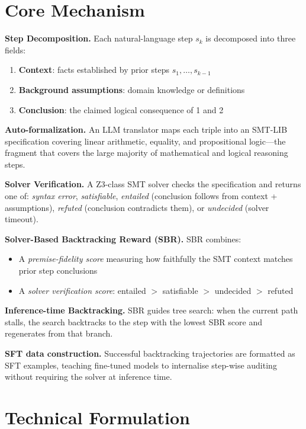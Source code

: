 \documentclass[10pt,twocolumn]{article}
\begin{document}
\section{Core Mechanism}

\textbf{Step Decomposition.} Each natural-language step $s_k$ is
decomposed into three fields:
\begin{enumerate}[itemsep=2pt,parsep=0pt]
  \item \textbf{Context}: facts established by prior steps $s_1,\ldots,s_{k-1}$
  \item \textbf{Background assumptions}: domain knowledge or definitions
  \item \textbf{Conclusion}: the claimed logical consequence of 1 and 2
\end{enumerate}

\textbf{Auto-formalization.} An LLM translator maps each triple into
an SMT-LIB specification covering linear arithmetic, equality, and
propositional logic---the fragment that covers the large majority of
mathematical and logical reasoning steps.

\textbf{Solver Verification.} A Z3-class SMT solver checks the
specification and returns one of:
\textit{syntax error}, \textit{satisfiable}, \textit{entailed}
(conclusion follows from context + assumptions),
\textit{refuted} (conclusion contradicts them), or
\textit{undecided} (solver timeout).

\textbf{Solver-Based Backtracking Reward (SBR).} SBR combines:
\begin{itemize}[itemsep=2pt,parsep=0pt]
  \item A \emph{premise-fidelity score} measuring how faithfully the
    SMT context matches prior step conclusions
  \item A \emph{solver verification score}: entailed $>$ satisfiable
    $>$ undecided $>$ refuted
\end{itemize}

\textbf{Inference-time Backtracking.} SBR guides tree search: when the
current path stalls, the search backtracks to the step with the
lowest SBR score and regenerates from that branch.

\textbf{SFT data construction.} Successful backtracking trajectories
are formatted as SFT examples, teaching fine-tuned models to internalise
step-wise auditing without requiring the solver at inference time.

\section{Technical Formulation}
\end{document}
